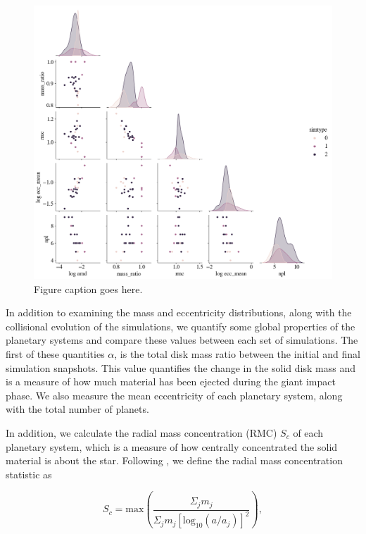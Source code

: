 \begin{figure}
\begin{center}
    \includegraphics[width=\textwidth]{figures/stip/corner_full_syn_iso.png}
    \caption{Figure caption goes here.\label{fig:corner_full_syn_iso}}
\end{center}
\end{figure}

In addition to examining the mass and eccentricity distributions, along with the collisional evolution of the simulations, we quantify some global properties of the planetary systems and compare these values between each set of simulations. The first of these quantities $\alpha$, is the total disk mass ratio between the initial and final simulation snapshots. This value quantifies the change in the solid disk mass and is a measure of how much material has been ejected during the giant impact phase. We also measure the mean eccentricity of each planetary system, along with the total number of planets.

In addition, we calculate the radial mass concentration (RMC) $S_{c}$ of each planetary system, which is a measure of how centrally concentrated the solid material is about the star. Following \cite{chambers01}, we define the radial mass concentration statistic as

\begin{equation}\label{eq:rmc}
	S_{c} = \mathrm{max} \left( \frac{\Sigma_{j} m_{j}}{\Sigma_{j} m_{j} \left[ \mathrm{log}_{10} \left( a / a_{j} \right) \right]^{2}} \right),
\end{equation}


